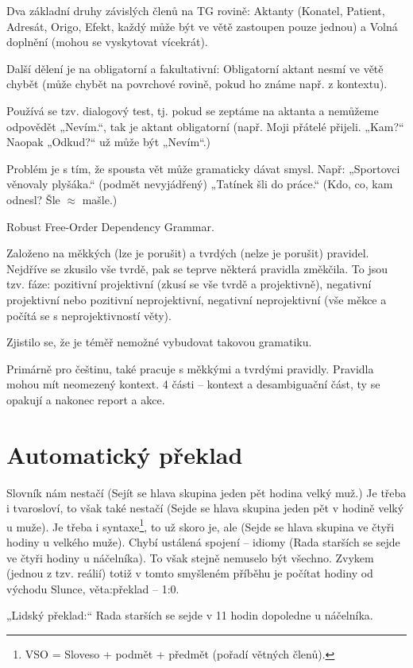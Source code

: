 \documentclass[12pt]{article}					%
\begin{document}
	\begin{definice}[Valence]
		Dva základní druhy závislých členů na TG rovině: Aktanty (Konatel, Patient, Adresát, Origo, Efekt, každý může být ve větě zastoupen pouze jednou) a Volná doplnění (mohou se vyskytovat vícekrát).
		
		Další dělení je na obligatorní a fakultativní: Obligatorní aktant nesmí ve větě chybět (může chybět na povrchové rovině, pokud ho známe např. z kontextu).

		Používá se tzv. dialogový test, tj. pokud se zeptáme na aktanta a nemůžeme odpovědět „Nevím.“, tak je aktant obligatorní (např. Moji přátelé přijeli. „Kam?“ Naopak „Odkud?“ už může být „Nevím“.)
	\end{definice}

	\begin{definice}
		Problém je s tím, že spousta vět může gramaticky dávat smysl. Např: „Sportovci věnovaly plyšáka.“ (podmět nevyjádřený) „Tatínek šli do práce.“ (Kdo, co, kam odnesl? Šle $\approx$ mašle.)
	\end{definice}

	\begin{definice}[RFODG]
		Robust Free-Order Dependency Grammar. 

		Založeno na měkkých (lze je porušit) a tvrdých (nelze je porušit) pravidel. Nejdříve se zkusilo vše tvrdě, pak se teprve některá pravidla změkčila. To jsou tzv. fáze: pozitivní projektivní (zkusí se vše tvrdě a projektivně), negativní projektivní nebo pozitivní neprojektivní, negativní neprojektivní (vše měkce a počítá se s neprojektivností věty).

		Zjistilo se, že je téměř nemožné vybudovat takovou gramatiku.
	\end{definice}

	\begin{definice}[LanGR]
		Primárně pro češtinu, také pracuje s měkkými a tvrdými pravidly. Pravidla mohou mít neomezený kontext. 4 části – kontext a desambiguační část, ty se opakují a nakonec report a akce.
	\end{definice}


\section{Automatický překlad}
\begin{poznamka}
	Slovník nám nestačí (Sejít se hlava skupina jeden pět hodina velký muž.) Je třeba i tvarosloví, to však také nestačí (Sejde se hlava skupina jeden pět v hodině velký u muže). Je třeba i syntaxe\footnote{VSO = Sloveso + podmět + předmět (pořadí větných členů).}, to už skoro je, ale (Sejde se hlava skupina ve čtyři hodiny u velkého muže). Chybí ustálená spojení – idiomy (Rada starších se sejde ve čtyři hodiny u náčelníka). To však stejně nemuselo být všechno. Zvykem (jednou z tzv. reálií) totiž v tomto smyšleném příběhu je počítat hodiny od východu Slunce, věta:překlad – 1:0.

	„Lidský překlad:“ Rada starších se sejde v 11 hodin dopoledne u náčelníka.
\end{poznamka}
\end{document}
